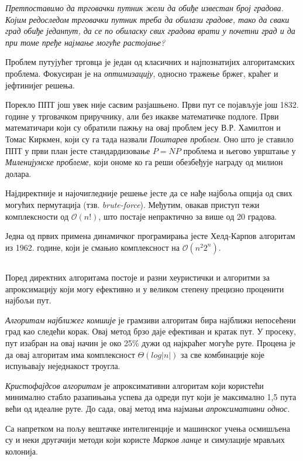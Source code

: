 \documentclass[11pt, oneside, a4paper]{article}
\begin{document}
\epigraph{
\textit{Претпоставимо да трговачки путник жели да обиђе известан број градова. Којим редоследом трговачки путник треба да обилази градове, тако да сваки град обиђе једанпут, да се по обиласку свих градова врати у почетни град и да при томе пређе најмање могуће растојање?}
 }{}
 
Проблем путујућег трговца је један од класичних и најпознатијих алгоритамских проблема. Фокусиран је на \textit{оптимизацију}, односно тражење бржег, краћег и јефтинијег решења. \par
{}
Порекло ППТ још увек није сасвим разјашњено. Први пут се појављује још 1832. године у трговачком приручнику, али без икакве математичке подлоге\footnotemark. Први математичари који су обратили пажњу на овај проблем јесу В.Р. Хамилтон и Томас Киркмен, који су га тада назвали \textit{Поштарев проблем}. Оно што је ставило ППТ у први план јесте стандардизовање $P = NP$ проблема и његово уврштање у \textit{Миленијумске проблеме}, који ономе ко га реши обезбеђује награду од милион долара.

\par
Најдиректније и најочигледније решење јесте да се нађе најбоља опција од свих могућих пермутација (тзв. \textit{brute-force}). Међутим, овакав приступ тежи комплексности од $\mathcal{O}(n!)$, што постаје непрактично за више од 20 градова.\par
Једна од првих примена динамичког програмирања јесте Хелд-Карпов алгоритам из 1962. године, који је смањио комплексност на $\mathcal{O}(n^2 2^n)$.
\subsection*{}
Поред директних алгоритама постоје и разни хеуристички и алгоритми за апроксимацију који могу ефективно и у великом степену прецизно проценити најбољи пут. \par
\textit{Алгоритам најближег комшије} је грамзиви алгоритам бира најближи непосећени град као следећи корак. Овај метод брзо даје ефективан и кратак пут. У просеку, пут изабран на овај начин је око 25\% дужи од најкраћег могуће руте. Процена је да овај алгоритам има комплексност $\Theta(log|n|)$ за све комбинације које испуњавају неједнакост троугла.\par
\textit{Кристофајдсов алгоритам} је апроксимативни алгоритам који користећи минимално стабло разапињања успева да одреди пут који је максимално 1,5 пута већи од идеалне руте. До сада, овај метод има најмањи \textit{апроксимативни однос}. \par
Са напретком на пољу вештачке интелигенције и машинског учења осмишљена су и неки другачији методи који користе \textit{Марков ланце} и симулације мрављих колонија.
\newpage
\end{document}
